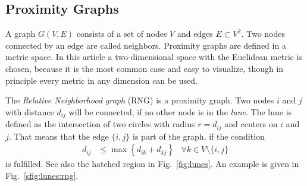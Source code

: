 \label{sec:model}
\subsection{Proximity Graphs}
\label{ssec:graphtypes}
    A graph \(G(V,E)\) consists of a set of nodes \(V\) and edges \(E \subset V^{2}\).
    Two nodes connected by an edge are called neighbors.
    Proximity graphs are defined in a metric space. In this article a
    two-dimensional space with the Euclidean metric is chosen, because
    it is the most common case and easy to visualize, though in principle
    every metric in any dimension can be used.

    The \emph{Relative Neighborhood graph} (RNG) \cite{Toussaint1980} is
    a proximity graph. Two nodes \(i\) and \(j\) with distance $d_{ij}$
    will be connected, if no other node is in the \emph {lune}. The lune
    is defined as the intersection of two circles with radius \(r =
    d_{ij}\) and centers on \(i\) and \(j\). That means that the edge
    $\{i,j\}$ is part of the graph, if the condition
    \begin{align*}
        d_{ij} &\le \max\left\{ d_{ik} + d_{kj} \right\} &\forall k \in V\setminus\{i,j\}
    \end{align*}
    is fulfilled. See also the hatched region
    in Fig.~\ref{fig:lunes}. An example is given in Fig.~\ref{sfig:lunes:rng}.

